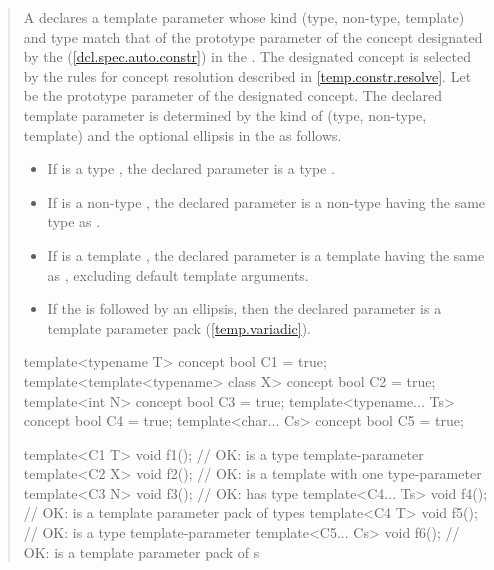 \begin{quote}
\begin{addedblock}
\setcounter{Paras}{8}
\pnum
A  declares a template parameter whose 
kind (type, non-type, template) and type match that of the prototype parameter 
of the concept designated by the  
(\ref{dcl.spec.auto.constr}) in the .
% 
The designated concept is selected by the rules for concept resolution 
described in \ref{temp.constr.resolve}.
% 
Let  be the prototype parameter of the designated concept.
% 
The declared template parameter is determined by the kind of  
(type, non-type, template) and the optional ellipsis in the
 as follows.
% 
\begin{itemize}
\item If  is a type , the declared
parameter is a type . 

\item If  is a non-type , the declared
parameter is a non-type  having the same 
type as .

\item If  is a template , the declared
parameter is a template  having the same 
 as , excluding default template 
arguments.

\item If the  is followed by an ellipsis,
then the declared parameter is a template parameter pack (\ref{temp.variadic}).
\end{itemize}
% 
\enterexample
\begin{codeblock}
template<typename T> concept bool C1 = true;
template<template<typename> class X> concept bool C2 = true;
template<int N> concept bool C3 = true;
template<typename... Ts> concept bool C4 = true;
template<char... Cs> concept bool C5 = true;

template<C1 T> void f1();     // OK:  is a type template-parameter
template<C2 X> void f2();     // OK:  is a template with one type-parameter
template<C3 N> void f3();     // OK:  has type 
template<C4... Ts> void f4(); // OK:  is a template parameter pack of types
template<C4 T> void f5();     // OK:  is a type template-parameter
template<C5... Cs> void f6(); // OK:  is a template parameter pack of s
\end{codeblock}
\exitexample


\end{addedblock}
\end{quote}
